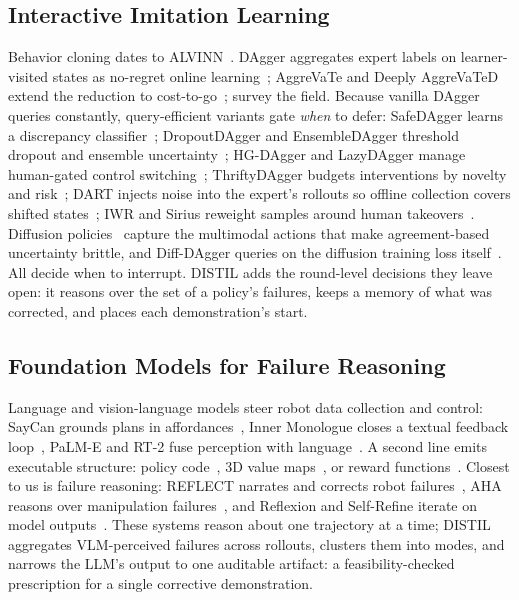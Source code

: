 \documentclass[letterpaper]{article} %
\begin{document}
\subsection{Interactive Imitation Learning}
Behavior cloning dates to ALVINN~\citep{pomerleau1988alvinn}. DAgger
aggregates expert labels on
learner-visited states as no-regret online
learning~\citep{ross2011dagger}; AggreVaTe and Deeply AggreVaTeD extend the
reduction to cost-to-go~\citep{ross2014aggrevate,sun2017aggrevated};
\citet{celemin2022iil} survey the field. Because vanilla DAgger queries
constantly, query-efficient variants gate \emph{when} to defer: SafeDAgger
learns a discrepancy classifier~\citep{zhang2017safedagger}; DropoutDAgger and
EnsembleDAgger threshold dropout and ensemble
uncertainty~\citep{menda2017dropoutdagger,menda2019ensembledagger,gal2016dropout,
lakshminarayanan2017ensembles}; HG-DAgger and LazyDAgger manage human-gated
control switching~\citep{kelly2019hgdagger,hoque2021lazydagger};
ThriftyDAgger budgets interventions by novelty and
risk~\citep{hoque2021thriftydagger}; DART injects noise into the expert's rollouts so offline
collection covers shifted states~\citep{laskey2017dart}; IWR and Sirius reweight samples
around human takeovers~\citep{mandlekar2020iwr,liu2023sirius}. Diffusion
policies~\citep{chi2023diffusionpolicy,ho2020ddpm,janner2022diffuser} capture
the multimodal actions that make agreement-based uncertainty brittle, and
Diff-DAgger queries on the diffusion training loss
itself~\citep{lee2025diffdagger}. All decide when to interrupt. DISTIL adds
the round-level decisions they leave open: it reasons over the set of a
policy's failures, keeps a memory of what was corrected, and places each
demonstration's start.

\subsection{Foundation Models for Failure Reasoning}
Language and vision-language models steer robot data collection and
control: SayCan grounds plans in affordances~\citep{ahn2022saycan}, Inner
Monologue closes a textual feedback loop~\citep{huang2022innermonologue},
PaLM-E and RT-2 fuse perception with language~\citep{driess2023palme,
brohan2023rt2}. A second line emits executable structure: policy
code~\citep{liang2023codeaspolicies,singh2023progprompt}, 3D value
maps~\citep{huang2023voxposer}, or reward
functions~\citep{ma2024eureka}. Closest to us is
failure reasoning: REFLECT narrates and corrects robot
failures~\citep{liu2023reflect}, AHA reasons over manipulation
failures~\citep{duan2025aha}, and Reflexion and Self-Refine iterate on model
outputs~\citep{shinn2023reflexion,madaan2023selfrefine}. These systems reason
about one trajectory at a time; DISTIL aggregates VLM-perceived failures
across rollouts, clusters them into modes, and narrows the LLM's output to
one auditable artifact: a feasibility-checked prescription for a single
corrective demonstration.
\end{document}
